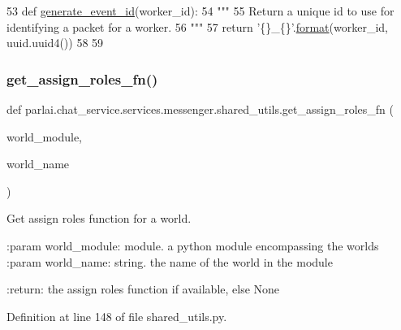 \begin{DoxyCode}
53 \textcolor{keyword}{def }\hyperlink{namespaceparlai_1_1mturk_1_1core_1_1shared__utils_aba2e4d48063dafc80e931f8925dbb755}{generate\_event\_id}(worker\_id):
54     \textcolor{stringliteral}{"""}
55 \textcolor{stringliteral}{    Return a unique id to use for identifying a packet for a worker.}
56 \textcolor{stringliteral}{    """}
57     \textcolor{keywordflow}{return} \textcolor{stringliteral}{'\{\}\_\{\}'}.\hyperlink{namespaceparlai_1_1mturk_1_1core_1_1shared__utils_afcac728e96b38bbad8cde6f7be4f613e}{format}(worker\_id, uuid.uuid4())
58 
59 
\end{DoxyCode}
\mbox{\label{namespaceparlai_1_1chat__service_1_1services_1_1messenger_1_1shared__utils_a1cf883c977b3fcd06db0d998ae976871}} 
\subsubsection{\texorpdfstring{get\+\_\+assign\+\_\+roles\+\_\+fn()}{get\_assign\_roles\_fn()}}
{\footnotesize\ttfamily def parlai.\+chat\+\_\+service.\+services.\+messenger.\+shared\+\_\+utils.\+get\+\_\+assign\+\_\+roles\+\_\+fn (\begin{DoxyParamCaption}\item[{}]{world\+\_\+module,  }\item[{}]{world\+\_\+name }\end{DoxyParamCaption})}

\begin{DoxyVerb}Get assign roles function for a world.

:param world_module:
    module. a python module encompassing the worlds
:param world_name:
    string. the name of the world in the module

:return:
    the assign roles function if available, else None
\end{DoxyVerb}
 

Definition at line 148 of file shared\+\_\+utils.\+py.


